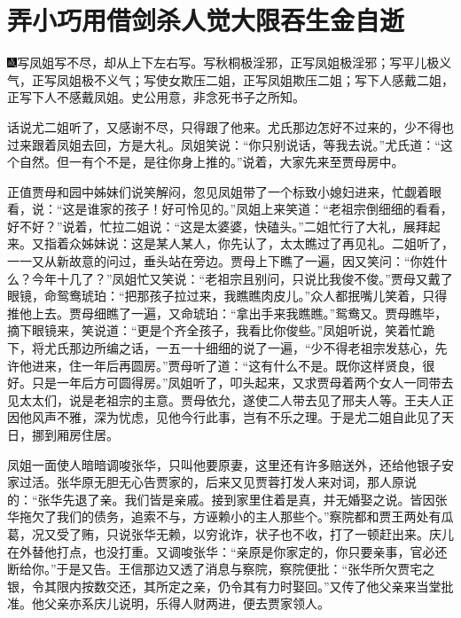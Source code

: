 
\chapter{弄小巧用借剑杀人\hspace{.5em}觉大限吞生金自逝}
{\includegraphics[width=3mm]{../Images/00005}\kaishu      写凤姐写不尽，却从上下左右写。写秋桐极淫邪，正写凤姐极淫邪；写平儿极义气，正写凤姐极不义气；写使女欺压二姐，正写凤姐欺压二姐；写下人感戴二姐，正写下人不感戴凤姐。史公用意，非念死书子之所知。}

话说尤二姐听了，又感谢不尽，只得跟了他来。尤氏那边怎好不过来的，少不得也过来跟着凤姐去回，方是大礼。凤姐笑说：``你只别说话，等我去说。''尤氏道：``这个自然。但一有个不是，是往你身上推的。''说着，大家先来至贾母房中。

正值贾母和园中姊妹们说笑解闷，忽见凤姐带了一个标致小媳妇进来，忙觑着眼看，说：``这是谁家的孩子！好可怜见的。''凤姐上来笑道：``老祖宗倒细细的看看，好不好？''说着，忙拉二姐说：``这是太婆婆，快磕头。''二姐忙行了大礼，展拜起来。又指着众姊妹说：这是某人某人，你先认了，太太瞧过了再见礼。二姐听了，一一又从新故意的问过，垂头站在旁边。贾母上下瞧了一遍，因又笑问：``你姓什么？今年十几了？''凤姐忙又笑说：``老祖宗且别问，只说比我俊不俊。''贾母又戴了眼镜，命鸳鸯琥珀：``把那孩子拉过来，我瞧瞧肉皮儿。''众人都抿嘴儿笑着，只得推他上去。贾母细瞧了一遍，又命琥珀：``拿出手来我瞧瞧。''鸳鸯又。贾母瞧毕，摘下眼镜来，笑说道：``更是个齐全孩子，我看比你俊些。''凤姐听说，笑着忙跪下，将尤氏那边所编之话，一五一十细细的说了一遍，``少不得老祖宗发慈心，先许他进来，住一年后再圆房。''贾母听了道：``这有什么不是。既你这样贤良，很好。只是一年后方可圆得房。''凤姐听了，叩头起来，又求贾母着两个女人一同带去见太太们，说是老祖宗的主意。贾母依允，遂使二人带去见了邢夫人等。王夫人正因他风声不雅，深为忧虑，见他今行此事，岂有不乐之理。于是尤二姐自此见了天日，挪到厢房住居。

凤姐一面使人暗暗调唆张华，只叫他要原妻，这里还有许多赔送外，还给他银子安家过活。张华原无胆无心告贾家的，后来又见贾蓉打发人来对词，那人原说的：``张华先退了亲。我们皆是亲戚。接到家里住着是真，并无婚娶之说。皆因张华拖欠了我们的债务，追索不与，方诬赖小的主人那些个。''察院都和贾王两处有瓜葛，况又受了贿，只说张华无赖，以穷讹诈，状子也不收，打了一顿赶出来。庆儿在外替他打点，也没打重。又调唆张华：``亲原是你家定的，你只要亲事，官必还断给你。''于是又告。王信那边又透了消息与察院，察院便批：``张华所欠贾宅之银，令其限内按数交还，其所定之亲，仍令其有力时娶回。''又传了他父亲来当堂批准。他父亲亦系庆儿说明，乐得人财两进，便去贾家领人。

